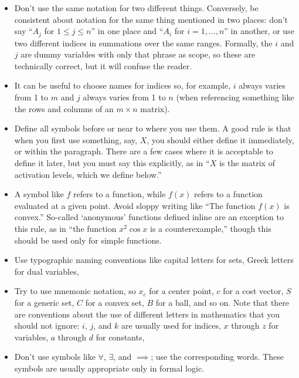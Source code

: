 \documentclass{article}
\begin{document}
\begin{itemize}
\item Don't use the same notation for two different things. 
    Conversely, be consistent about notation for the same thing mentioned in two places: don't say ``$A_j$ for $1 \leq j \leq n$'' in one place and ``$A_i$ for $i=1,\ldots,n$''  in another, or use two different indices in summations over the same ranges. 
    Formally, the $i$ and $j$ are dummy variables with only that phrase as scope, so these are technically correct, but it will confuse the reader.

\item It can be useful to choose names for indices so, for example, $i$ always varies from 1 to $m$ and $j$ always varies from 1 to $n$ (when referencing something like the rows and columns of an $m \times n$ matrix).

\item Define all symbols before or near to where you use them.  
    A good rule is that when you first use something, say, $X$, you should either define it immediately, or within the paragraph. 
    There are a few cases where it is acceptable to define it later, but you must say this explicitly, as in ``$X$ is the matrix of activation levels, which we define below.''

\item A symbol like $f$ refers to a function, while $f(x)$ refers to a function evaluated at a given point. 
    Avoid sloppy writing like ``The function $f(x)$ is convex.'' 
    So-called `anonymous' functions defined inline are an exception to this rule, as in ``the function $x^2 \cos x$ is a counterexample,'' though this should be used only for simple functions.

\item Use typographic naming conventions like capital letters for sets, Greek letters for dual variables, \etc\

\item Try to use mnemonic notation, so $x_c$ for a center point, $c$ for a cost vector, $S$ for a generic set, $C$ for a convex set, $B$ for a ball, and so on. 
    Note that there are conventions about the use of different letters in mathematics that you should not ignore: $i$, $j$, and $k$ are usually used for indices, $x$ through $z$ for variables, $a$ through $d$ for constants, \etc\

\item Don't use symbols like $\forall$, $\exists$, and $\implies$; use the corresponding words. 
    These symbols are usually appropriate only in formal logic. 


\end{itemize}
\end{document}
